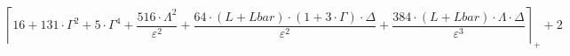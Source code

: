 \[\left\lceil 16 + 131 \cdot \Gamma^{2} + 5 \cdot \Gamma^{4} + \frac{516 \cdot \Lambda^{2}}{\varepsilon^{2}} + \frac{64 \cdot \left(L + Lbar\right) \cdot \left(1 + 3 \cdot \Gamma\right) \cdot \Delta}{\varepsilon^{2}} + \frac{384 \cdot \left(L + Lbar\right) \cdot \Lambda \cdot \Delta}{\varepsilon^{3}} \right\rceil_{+} + 2\]

